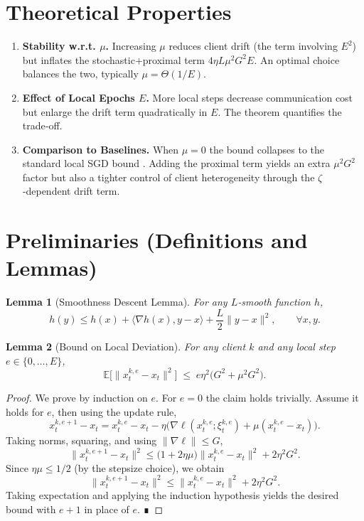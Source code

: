 \documentclass[11pt]{article}
\newtheorem{lemma}{Lemma}
\begin{document}
\section*{Theoretical Properties}
\begin{enumerate}[label=\arabic*.]
\item \textbf{Stability w.r.t. $\mu$.}  
Increasing $\mu$ reduces client drift (the term involving $E^{2}$) but
inflates the stochastic+proximal term $4\eta L\mu^{2}G^{2}E$.  An optimal
choice balances the two, typically $\mu =\Theta(1/E)$.
\item \textbf{Effect of Local Epochs $E$.}  
More local steps decrease communication cost but enlarge the drift term
quadratically in $E$.  The theorem quantifies the trade‑off.
\item \textbf{Comparison to Baselines.}  
When $\mu=0$ the bound collapses to the standard local SGD bound
\cite{stich2019local}.  Adding the proximal term yields an extra
$\mu^{2}G^{2}$ factor but also a tighter control of client heterogeneity
through the $\zeta$‑dependent drift term.
\end{enumerate}

\section*{Preliminaries (Definitions and Lemmas)}
\begin{lemma}[Smoothness Descent Lemma]\label{lem:smooth}
For any $L$‑smooth function $h$,
\[
h(y)\le h(x)+\langle\nabla h(x),y-x\rangle+\frac{L}{2}\|y-x\|^{2},
\qquad\forall x,y.
\]
\end{lemma}

\begin{lemma}[Bound on Local Deviation]\label{lem:dev}
For any client $k$ and any local step $e\in\{0,\dots,E\}$,
\[
\mathbb{E}\!\big[\|x^{k,e}_t-x_t\|^{2}\big]
\;\le\;
e\eta^{2}\big(G^{2}+\mu^{2}G^{2}\big).
\]
\end{lemma}
\begin{proof}
We prove by induction on $e$.  
For $e=0$ the claim holds trivially.  
Assume it holds for $e$, then using the update rule,
\[
x^{k,e+1}_t-x_t
= x^{k,e}_t-x_t-\eta\big(\nabla\ell(x^{k,e}_t;\xi^{k,e}_t)
               +\mu(x^{k,e}_t-x_t)\big).
\]
Taking norms, squaring, and using $\|\nabla\ell\|\le G$,
\[
\|x^{k,e+1}_t-x_t\|^{2}
\le\big(1+2\eta\mu\big)\|x^{k,e}_t-x_t\|^{2}+2\eta^{2}G^{2}.
\]
Since $\eta\mu\le 1/2$ (by the stepsize choice), we obtain
\[
\|x^{k,e+1}_t-x_t\|^{2}
\le\|x^{k,e}_t-x_t\|^{2}+2\eta^{2}G^{2}.
\]
Taking expectation and applying the induction hypothesis yields the
desired bound with $e+1$ in place of $e$.  ∎
\end{proof}
\end{document}

